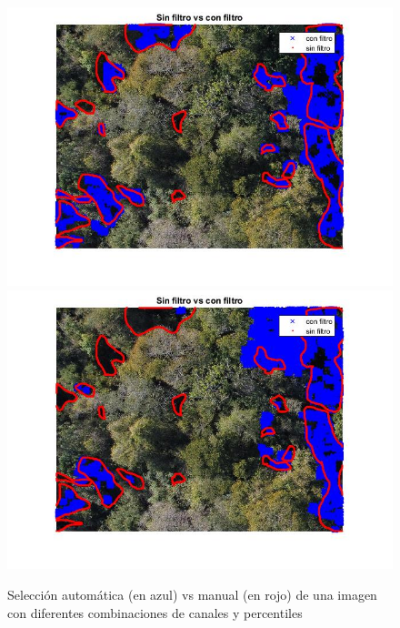 \begin{figure}
    \includegraphics[width=.3\textwidth]{Imagenes/IIC/p90/BG/200a.jpg}\hfill
    \includegraphics[width=.3\textwidth]{Imagenes/IIC/p90/GR/200a.jpg}\hfill
    
    \caption{Selección automática (en azul) vs manual (en rojo) de una imagen con diferentes combinaciones de canales y percentiles}
\end{figure}\label{dji200}

